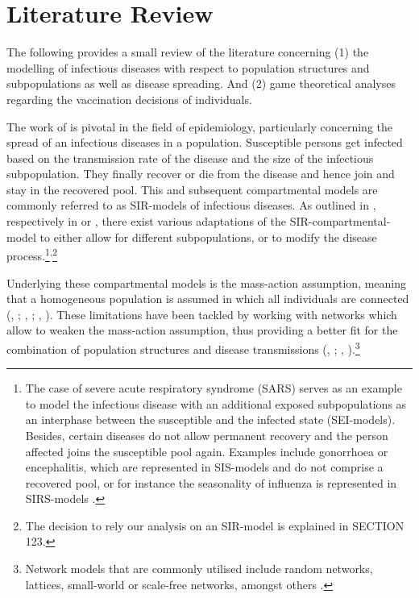 \documentclass[11pt]{article}
\begin{document}
\clearpage
\section{Literature Review}
The following provides a small review of the literature concerning (1) the modelling of infectious diseases with respect to population structures and subpopulations as well as disease spreading. And (2) game theoretical analyses regarding the vaccination decisions of individuals. 

The work of \cite{kermack1927} is pivotal in the field of epidemiology, particularly concerning the spread of an infectious diseases in a population. Susceptible persons get infected based on the transmission rate of the disease and the size of the infectious subpopulation. They finally recover or die from the disease and hence join and stay in the recovered pool. This and subsequent compartmental models are commonly referred to as SIR-models of infectious diseases. 
As outlined in \cite{earn2008}, respectively in \cite{dadlani2013} or \cite{sun2016}, there exist various adaptations of the SIR-compartmental-model to either allow for different subpopulations, or to modify the disease process.\footnote{The case of severe acute respiratory syndrome (SARS) serves as an example to model the infectious disease with an additional exposed subpopulations as an interphase between the susceptible and the infected state (SEI-models). Besides, certain diseases do not allow permanent recovery and the person affected joins the susceptible pool again. Examples include gonorrhoea or encephalitis, which are represented in SIS-models and do not comprise a recovered pool, or for instance the seasonality of influenza is represented in SIRS-models \citep{dadlani2013}.}\textsuperscript{,}\footnote{The decision to rely our analysis on an SIR-model is explained in SECTION 123.} 

Underlying these compartmental models is the mass-action assumption, meaning that a homogeneous population is assumed in which all individuals are connected (\citeauthor{heesterbeek2005}, \citeyear{heesterbeek2005}; \citeauthor{rusu2015}, \citeyear{rusu2015}; \citeauthor{wilson1945a}, \citeyear{wilson1945a}). These limitations have been tackled by working with networks which allow to weaken the mass-action assumption, thus providing a better fit for the combination of population structures and disease transmissions (\citeauthor{keeling2005}, \citeyear{keeling2005}; \citeauthor{meyers2005}, \citeyear{meyers2005}).\footnote{Network models that are commonly utilised include random networks, lattices, small-world or scale-free networks, amongst others \citep{keeling2005}.}    
\end{document}

